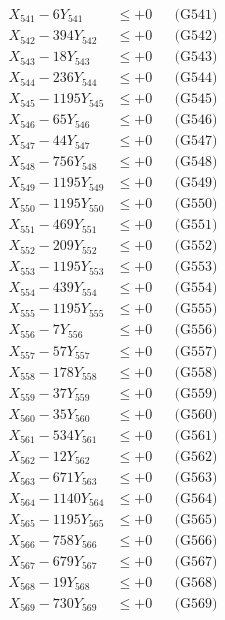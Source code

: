 \documentclass[a4paper,10pt]{article}
\begin{document}
{\begin{align}
\allowbreak
X_{541} - 6Y_{541} &\leq +0 && \text{(G541)} \\
X_{542} - 394Y_{542} &\leq +0 && \text{(G542)} \\
X_{543} - 18Y_{543} &\leq +0 && \text{(G543)} \\
X_{544} - 236Y_{544} &\leq +0 && \text{(G544)} \\
X_{545} - 1195Y_{545} &\leq +0 && \text{(G545)} \\
X_{546} - 65Y_{546} &\leq +0 && \text{(G546)} \\
X_{547} - 44Y_{547} &\leq +0 && \text{(G547)} \\
X_{548} - 756Y_{548} &\leq +0 && \text{(G548)} \\
X_{549} - 1195Y_{549} &\leq +0 && \text{(G549)} \\
X_{550} - 1195Y_{550} &\leq +0 && \text{(G550)} \\
\allowbreak
X_{551} - 469Y_{551} &\leq +0 && \text{(G551)} \\
X_{552} - 209Y_{552} &\leq +0 && \text{(G552)} \\
X_{553} - 1195Y_{553} &\leq +0 && \text{(G553)} \\
X_{554} - 439Y_{554} &\leq +0 && \text{(G554)} \\
X_{555} - 1195Y_{555} &\leq +0 && \text{(G555)} \\
X_{556} - 7Y_{556} &\leq +0 && \text{(G556)} \\
X_{557} - 57Y_{557} &\leq +0 && \text{(G557)} \\
X_{558} - 178Y_{558} &\leq +0 && \text{(G558)} \\
X_{559} - 37Y_{559} &\leq +0 && \text{(G559)} \\
X_{560} - 35Y_{560} &\leq +0 && \text{(G560)} \\
\allowbreak
X_{561} - 534Y_{561} &\leq +0 && \text{(G561)} \\
X_{562} - 12Y_{562} &\leq +0 && \text{(G562)} \\
X_{563} - 671Y_{563} &\leq +0 && \text{(G563)} \\
X_{564} - 1140Y_{564} &\leq +0 && \text{(G564)} \\
X_{565} - 1195Y_{565} &\leq +0 && \text{(G565)} \\
X_{566} - 758Y_{566} &\leq +0 && \text{(G566)} \\
X_{567} - 679Y_{567} &\leq +0 && \text{(G567)} \\
X_{568} - 19Y_{568} &\leq +0 && \text{(G568)} \\
X_{569} - 730Y_{569} &\leq +0 && \text{(G569)} \\

\end{align}}
\end{document}
